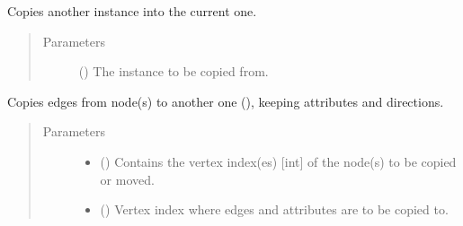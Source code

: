 \documentclass[letterpaper,10pt,english]{sphinxmanual}
\begin{document}
\begin{fulllineitems}

\begin{fulllineitems}
\label{\detokenize{main:pypath.main.PyPath.consistency}}
\end{fulllineitems}


\begin{fulllineitems}
\label{\detokenize{main:pypath.main.PyPath.copy}}
Copies another {\hyperref[\detokenize{main:pypath.main.PyPath}]{}} instance into the
current one.
\begin{quote}\begin{description}
\item[{Parameters}] \leavevmode
{} ({\hyperref[\detokenize{main:pypath.main.PyPath}]{}}) \textendash{} The instance to be copied from.

\end{description}\end{quote}

\end{fulllineitems}


\begin{fulllineitems}
\label{\detokenize{main:pypath.main.PyPath.copy_edges}}
Copies edges from  node(s) to another one (),
keeping attributes and directions.
\begin{quote}\begin{description}
\item[{Parameters}] \leavevmode\begin{itemize}
\item {} 
 () \textendash{} Contains the vertex index(es) {[}int{]} of the node(s) to be
copied or moved.

\item {} 
 () \textendash{} Vertex index where edges and attributes are to be copied to.


\end{itemize}
\end{description}
\end{quote}
\end{fulllineitems}
\end{fulllineitems}
\end{document}

